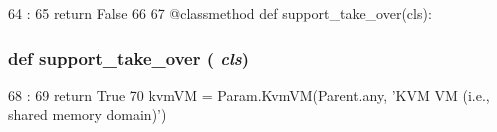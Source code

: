 \begin{DoxyCode}
64                            :
65         return False
66 
67     @classmethod
    def support_take_over(cls):
\end{DoxyCode}
\hypertarget{classBaseKvmCPU_1_1BaseKvmCPU_aa201537acf29724056129b8efad43371}{
\subsubsection[{support\_\-take\_\-over}]{\setlength{\rightskip}{0pt plus 5cm}def support\_\-take\_\-over ( {\em cls})}}
\label{classBaseKvmCPU_1_1BaseKvmCPU_aa201537acf29724056129b8efad43371}



\begin{DoxyCode}
68                               :
69         return True
70 
    kvmVM = Param.KvmVM(Parent.any, 'KVM VM (i.e., shared memory domain)')
\end{DoxyCode}


